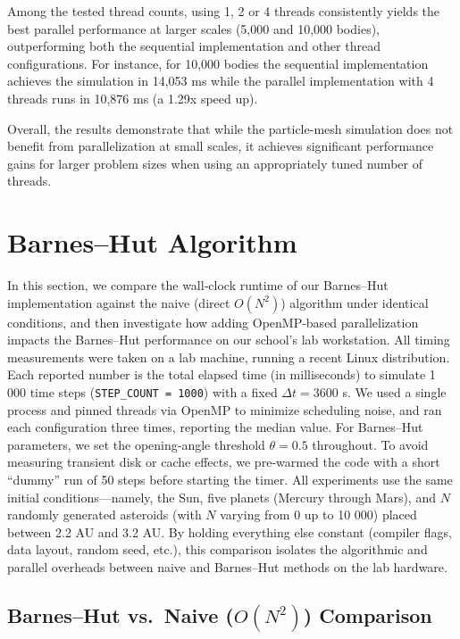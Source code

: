 \documentclass{article}
\begin{document}
Among the tested thread counts, using 1, 2 or 4 threads consistently yields the best parallel performance at larger scales (5,000 and 10,000 bodies), outperforming both the sequential implementation and other thread configurations. 
For instance, for 10,000 bodies the sequential implementation achieves the simulation in 14,053 ms while the parallel implementation with 4 threads runs in 10,876 ms (a 1.29x speed up).

Overall, the results demonstrate that while the particle-mesh simulation does not benefit from parallelization at small scales, it achieves significant performance gains for larger problem sizes when using an appropriately tuned number of threads. 

\section{Barnes–Hut Algorithm}

\noindent
In this section, we compare the wall‐clock runtime of our Barnes–Hut implementation against the naive (direct \(O(N^2)\)) algorithm under identical conditions, and then investigate how adding OpenMP‐based parallelization impacts the Barnes–Hut performance on our school’s lab workstation. All timing measurements were taken on a lab machine, running a recent Linux distribution. Each reported number is the total elapsed time (in milliseconds) to simulate 1 000 time steps (\texttt{STEP\_COUNT = 1000}) with a fixed \(\Delta t = 3600\) s. We used a single process and pinned threads via OpenMP to minimize scheduling noise, and ran each configuration three times, reporting the median value. For Barnes–Hut parameters, we set the opening‐angle threshold \(\theta = 0.5\) throughout. To avoid measuring transient disk or cache effects, we pre‐warmed the code with a short “dummy” run of 50 steps before starting the timer. All experiments use the same initial conditions—namely, the Sun, five planets (Mercury through Mars), and \(N\) randomly generated asteroids (with \(N\) varying from 0 up to 10 000) placed between 2.2 AU and 3.2 AU. By holding everything else constant (compiler flags, data layout, random seed, etc.), this comparison isolates the algorithmic and parallel overheads between naive and Barnes–Hut methods on the lab hardware.


\subsection{Barnes–Hut vs.\ Naive ($O(N^2)$) Comparison}
\end{document}
